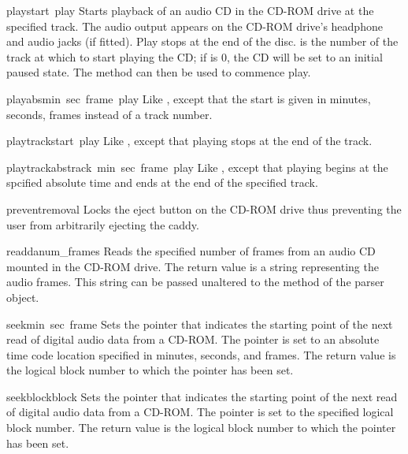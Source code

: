 \begin{funcdesc}{play}{start\, play}
Starts playback of an audio CD in the CD-ROM drive at the specified
track.  The audio output appears on the CD-ROM drive's headphone and
audio jacks (if fitted).  Play stops at the end of the disc.
 is the number of the track at which to start playing the
CD; if  is 0, the CD will be set to an initial paused
state.  The method  can then be used to commence
play.
\end{funcdesc}

\begin{funcdesc}{playabs}{min\, sec\, frame\, play}
Like , except that the start is given in minutes,
seconds, frames instead of a track number.
\end{funcdesc}

\begin{funcdesc}{playtrack}{start\, play}
Like , except that playing stops at the end of the track.
\end{funcdesc}

\begin{funcdesc}{playtrackabs}{track\, min\, sec\, frame\, play}
Like , except that playing begins at the spcified
absolute time and ends at the end of the specified track.
\end{funcdesc}

\begin{funcdesc}{preventremoval}{}
Locks the eject button on the CD-ROM drive thus preventing the user
from arbitrarily ejecting the caddy.
\end{funcdesc}

\begin{funcdesc}{readda}{num_frames}
Reads the specified number of frames from an audio CD mounted in the
CD-ROM drive.  The return value is a string representing the audio
frames.  This string can be passed unaltered to the 
method of the parser object.
\end{funcdesc}

\begin{funcdesc}{seek}{min\, sec\, frame}
Sets the pointer that indicates the starting point of the next read of
digital audio data from a CD-ROM.  The pointer is set to an absolute
time code location specified in minutes, seconds, and frames.  The
return value is the logical block number to which the pointer has been
set.
\end{funcdesc}

\begin{funcdesc}{seekblock}{block}
Sets the pointer that indicates the starting point of the next read of
digital audio data from a CD-ROM.  The pointer is set to the specified
logical block number.  The return value is the logical block number to
which the pointer has been set.
\end{funcdesc}

